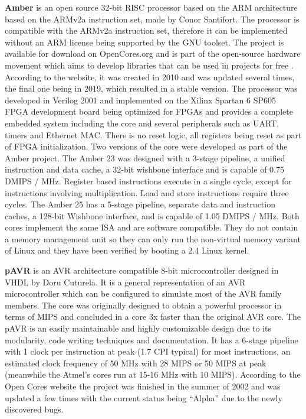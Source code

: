 \hspace{0.5cm} \textbf{Amber} is an open source 32-bit RISC processor based on the ARM architecture based on the ARMv2a instruction set, made by Conor Santifort. The processor is compatible with the
ARMv2a instruction set, therefore it can be implemented without an ARM license being
supported by the GNU toolset. The project is available for download on OpenCores.org and
is part of the open-source hardware movement which aims to develop libraries that can be
used in projects for free \cite{Amber}. According to the website, it was created in 2010 and was
updated several times, the final one being in 2019, which resulted in a stable version. The
processor was developed in Verilog 2001 and implemented on the Xilinx Spartan 6 SP605
FPGA development board being optimized for FPGAs and provides a complete embedded
system including the core and several peripherals such as UART, timers and Ethernet MAC.
There is no reset logic, all registers being reset as part of FPGA initialization. Two versions
of the core were developed as part of the Amber project. The Amber 23 was designed with a
3-stage pipeline, a unified instruction and data cache, a 32-bit wishbone interface and is
capable of 0.75 DMIPS / MHz. Register based instructions execute in a single cycle, except
for instructions involving multiplication. Load and store instructions require three cycles. The
Amber 25 has a 5-stage pipeline, separate data and instruction caches, a 128-bit Wishbone
interface, and is capable of 1.05 DMIPS / MHz. Both cores implement the same ISA and are
software compatible. They do not contain a memory management unit so they can only run
the non-virtual memory variant of Linux and they have been verified by booting a 2.4 Linux
kernel. \cite{Amber}\cite{SantifortAmber}

\hspace{0.5cm} \textbf{pAVR} is an AVR architecture compatible 8-bit microcontroller designed in VHDL by
Doru Cuturela. It is a general representation of an AVR microcontroller which can be
configured to simulate most of the AVR family members. The core was originally designed
to obtain a powerful processor in terms of MIPS and concluded in a core 3x faster than the
original AVR core. The pAVR is an easily maintainable and highly customizable design due
to its modularity, code writing techniques and documentation. It has a 6-stage pipeline with 1
clock per instruction at peak (1.7 CPI typical) for most instructions, an estimated clock
frequency of 50 MHz with 28 MIPS or 50 MIPS at peak (meanwhile the Atmel’s cores run at
15-16 MHz with 10 MIPS). According to the Open Cores website the project was finished in
the summer of 2002 and was updated a few times with the current status being “Alpha” due
to the newly discovered bugs. \cite{CuturelapAVR}

